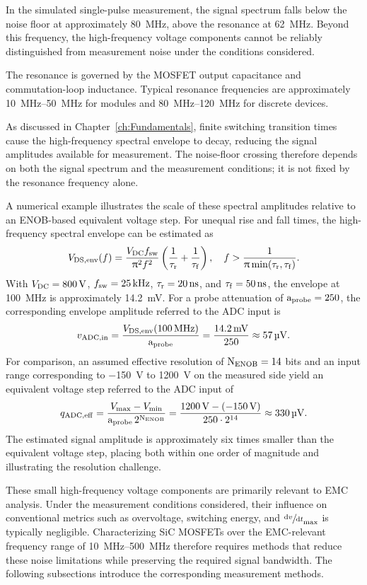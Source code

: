 In the simulated single-pulse measurement, the signal spectrum falls below the noise floor at approximately \SI{80}{MHz}, above the resonance at \SI{62}{MHz}.
Beyond this frequency, the high-frequency voltage components cannot be reliably distinguished from measurement noise under the conditions considered.

The resonance is governed by the MOSFET output capacitance and commutation-loop inductance.
Typical resonance frequencies are approximately \SIrange{10}{50}{MHz} for modules and \SIrange{80}{120}{MHz} for discrete devices.

As discussed in Chapter~\ref{ch:Fundamentals}, finite switching transition times cause the high-frequency spectral envelope to decay, reducing the signal amplitudes available for measurement.
The noise-floor crossing therefore depends on both the signal spectrum and the measurement conditions; it is not fixed by the resonance frequency alone.

A numerical example illustrates the scale of these spectral amplitudes relative to an ENOB-based equivalent voltage step.
For unequal rise and fall times, the high-frequency spectral envelope can be estimated as~\cite{bi_prediction_2019}
\begin{equation}
	{V}_{\mathrm{DS,env}}(f) = \dfrac{{V}_{\mathrm{DC}}{f}_{\mathrm{sw}}}{\uppi^2 f^2}
	\left(\dfrac{1}{{\tau}_{\mathrm{r}}}+\dfrac{1}{{\tau}_{\mathrm{f}}}\right),
	\quad f > \dfrac{1}{\uppi\min({\tau}_{\mathrm{r}},{\tau}_{\mathrm{f}})}.
\end{equation}
With ${V}_{\mathrm{DC}} = \SI{800}{V}$, ${f}_{\mathrm{sw}} = \SI{25}{kHz}$, ${\tau}_{\mathrm{r}} = \SI{20}{ns}$, and ${\tau}_{\mathrm{f}} = \SI{50}{ns}$, the envelope at \SI{100}{MHz} is approximately \SI{14.2}{mV}.
For a probe attenuation of $\text{a}_{\text{probe}} = 250$, the corresponding envelope amplitude referred to the ADC input is
\begin{equation}
	{v}_{\mathrm{ADC,in}} = \dfrac{{V}_{\mathrm{DS,env}}(\SI{100}{MHz})}{\text{a}_{\text{probe}}}
	= \dfrac{\SI{14.2}{mV}}{250} \approx \SI{57}{\micro V}.
\end{equation}
For comparison, an assumed effective resolution of $\text{N}_{\text{ENOB}} = 14$ bits and an input range corresponding to \SI{-150}{V} to \SI{1200}{V} on the measured side yield an equivalent voltage step referred to the ADC input of
\begin{equation}
	{q}_{\mathrm{ADC,eff}} = \dfrac{{V}_{\mathrm{max}}-{V}_{\mathrm{min}}}{\text{a}_{\text{probe}}\,2^{\text{N}_{\text{ENOB}}}}
	= \dfrac{\SI{1200}{V}-(\SI{-150}{V})}{250\cdot 2^{14}}
	\approx \SI{330}{\micro V}.
\end{equation}
The estimated signal amplitude is approximately six times smaller than the equivalent voltage step, placing both within one order of magnitude and illustrating the resolution challenge.

These small high-frequency voltage components are primarily relevant to EMC analysis.
Under the measurement conditions considered, their influence on conventional metrics such as overvoltage, switching energy, and $\sfrac{\textnormal{d}v}{\textnormal{d}t}_\text{max}$ is typically negligible.
Characterizing SiC MOSFETs over the EMC-relevant frequency range of \SIrange{10}{500}{MHz} therefore requires methods that reduce these noise limitations while preserving the required signal bandwidth.
The following subsections introduce the corresponding measurement methods.